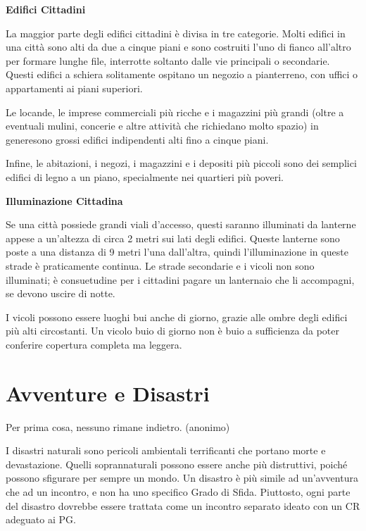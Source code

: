 \documentclass[a4paper,11pt,twoside,openany]{book}
\begin{document}
\textbf{Edifici Cittadini}

La maggior parte degli edifici cittadini è divisa in tre categorie. Molti edifici in una città sono alti da due a cinque piani e sono costruiti l'uno di fianco all'altro per formare lunghe file, interrotte soltanto dalle vie principali o secondarie. Questi edifici a schiera solitamente ospitano un negozio a pianterreno, con uffici o appartamenti ai piani superiori.

Le locande, le imprese commerciali più ricche e i magazzini più grandi (oltre a eventuali mulini, concerie e altre attività che richiedano molto spazio) in generesono grossi edifici indipendenti alti fino a cinque piani.

Infine, le abitazioni, i negozi, i magazzini e i depositi più piccoli sono dei semplici edifici di legno a un piano, specialmente nei quartieri più poveri.

\textbf{Illuminazione Cittadina}

Se una città possiede grandi viali d'accesso, questi saranno illuminati da lanterne appese a un'altezza di circa 2 metri sui lati degli edifici. Queste lanterne sono poste a una distanza di 9 metri l'una dall'altra, quindi l'illuminazione in queste strade è praticamente continua. Le strade secondarie e i vicoli non sono illuminati; è consuetudine per i cittadini pagare un lanternaio che li accompagni, se devono uscire di notte.

I vicoli possono essere luoghi bui anche di giorno, grazie alle ombre degli edifici più alti circostanti. Un vicolo buio di giorno non è buio a sufficienza da poter conferire copertura completa ma leggera.

\pagebreak

\section{Avventure e Disastri}

\label{avventure-e-disastri}
\begin{tcolorbox}[enhanced,arc=5pt,boxrule=0.3pt]{Per prima cosa, nessuno rimane indietro. (anonimo)}\end{tcolorbox}\medskip
I disastri naturali sono pericoli ambientali terrificanti che portano morte e devastazione. Quelli soprannaturali posso­no essere anche più distruttivi, poiché possono sfigurare per sempre un mondo. Un disastro è più simile ad un'avventura che ad un incontro, e non ha uno specifico Grado di Sfida. Piuttosto, ogni parte del disastro dovrebbe essere trattata come un incontro separato ideato con un CR adeguato ai PG.
\end{document}
